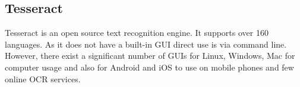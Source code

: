 \subsection{Tesseract}

Tesseract is an open source text recognition engine. It supports over 160 languages. As it does not have a built-in GUI direct use is via command line. However, there exist a significant number of GUIs for Linux, Windows, Mac for computer usage and also for Android and iOS to use on mobile phones and few online OCR services. \cite{tesseract1}





